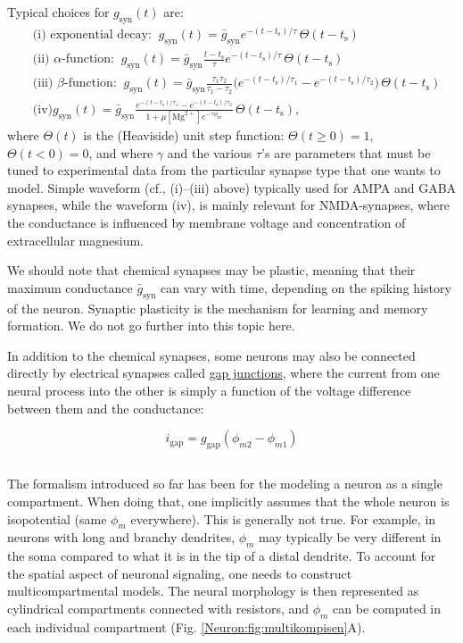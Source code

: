 Typical choices for $g_\text{syn}(t)$ are: 
\begin{align}
&\text{(i) exponential decay:} \;\; g_\text{syn}(t) = \bar{g}_\text{syn} e^{-(t-t_\text{s})/\tau}\, \Theta(t-t_\text{s}) \\
&\text{(ii) $\alpha$-function:} \;\; g_\text{syn}(t) = \bar{g}_\text{syn} \frac{t-t_\text{s}}{\tau} e^{-(t-t_\text{s})/\tau} \, \Theta(t-t_\text{s}) \\
&\text{(iii) $\beta$-function:} \;\; g_\text{syn}(t) = \bar{g}_\text{syn} \frac{\tau_1 \tau_2}{\tau_1-\tau_2} 
\Big( e^{-(t-t_\text{s})/\tau_1} - e^{-(t-t_\text{s})/\tau_2} \Big) \, \Theta(t-t_\text{s}) \\
& \text{(iv)} g_\text{syn}(t) = \bar{g}_\text{syn} \frac{e^{-(t-t_\text{s})/\tau_1} - e^{-(t-t_\text{s})/\tau_2}} {1+\mu [\text{Mg}^{2+}] e^{-\gamma \phi_m} } \, \Theta(t-t_\text{s}),
\label{eq:synapseforms}
\end{align}
where $\Theta(t)$ is the (Heaviside) unit step function: $\Theta(t \ge 0)=1$,  $\Theta(t< 0)=0$, and where $\gamma$ and the various $\tau$'s are parameters that must be tuned to experimental data from the particular synapse type that one wants to model. 
Simple waveform (cf., (i)--(iii) above) typically used for AMPA  and GABA synapses, while the waveform (iv), is mainly relevant for NMDA-synapses, where the conductance is influenced by membrane voltage and concentration of extracellular magnesium. 

We should note that chemical synapses may be plastic, meaning that their maximum conductance $\bar{g}_\text{syn}$ can vary with time, depending on the spiking history of the neuron. Synaptic plasticity is the mechanism for learning and memory formation. We do not go further into this topic here. 

In addition to the chemical synapses, some neurons may also be connected directly by electrical synapses called \underline{gap junctions}, where the current from one neural process into the other is simply a function of the voltage difference between them and the conductance: 

\begin{equation}
i_\text{gap}=g_\text{gap} (\phi_{m2}-\phi_{m1})
\label{eq:gapjunction}
\end{equation}



\subsection{}
The formalism introduced so far has been for the modeling a neuron as a single compartment. When doing that, one implicitly assumes that the whole neuron is isopotential (same $\phi_m$ everywhere). This is generally not true. For example, in neurons with long and branchy dendrites, $\phi_m$ may typically be very different in the soma compared to what it is in the tip of a distal dendrite. To account for the spatial aspect of neuronal signaling, one needs to construct multicompartmental models. The neural morphology is then represented as cylindrical compartments connected with resistors, and $\phi_m$ can be computed in each individual compartment  (Fig. \ref{Neuron:fig:multikompisen}A). 


